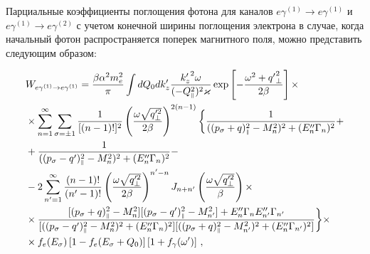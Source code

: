  Парциальные коэффициенты поглощения фотона для каналов $e \gamma^{(1)} \to 
 e\gamma^{(1)}$ и $e \gamma^{(1)} \to e\gamma^{(2)}$ с учетом конечной ширины 
 поглощения электрона в случае, когда начальный фотон 
 распространяется поперек магнитного поля, можно 
 представить следующим образом:


\begin{equation}\nonumber
	\begin{aligned}\label{Wres}
		&W_{e\gamma^{(1)}\to e\gamma^{(1)}}=\frac{\beta\alpha^2m_e^2}{\pi} \int 
		dQ_0dk'_z \frac{{k_z'}^2\omega } 
		{(-Q_{\mbox{\tiny $\|$}}^2)^2\varkappa}\exp\left[-\frac{\omega^2+{q'}_\perp^2}{2\beta}\right]\times
		\\
		&\times\sum_{n=1}^{\infty}\sum_{\sigma=\pm 1}\frac{1}{[(n-1)!]^2}\left(\frac{\omega \sqrt{q_\perp'^2}}{2\beta}\right)^{2(n-1)}\bigg\{
		\frac{1}{((p_\sigma+q)_{\mbox{\tiny $\|$}}^2-M_n^2)^2+(E''_n\Gamma_n)^2}  +\\
		&+\frac{1}{((p_\sigma-q')_{\mbox{\tiny $\|$}}^2-M_n^2)^2+(E''_n\Gamma_n)^2}-
		\\
		&-2
		\sum_{n'=1}^{\infty}\frac{(n-1)!}{(n'-1)!}\left(\frac{\omega \sqrt{q_\perp'^2}}{2\beta}\right)^{n'-n}J_{n+n'}\left(\frac{\omega \sqrt{q_\perp'^2}}{\beta}\right)\times\\
		&\times\frac{[(p_\sigma+q)^2_{\mbox{\tiny $\|$}}-M_n^2][(p_\sigma-q')^2_{\mbox{\tiny $\|$}}-M^2_{n'}]+E''_n\Gamma_nE''_{n'}\Gamma_{n'}}{[((p_\sigma-q')_{\mbox{\tiny $\|$}}^2-M_n^2)^2+(E''_n\Gamma_n)^2][((p_\sigma+q)_{\mbox{\tiny $\|$}}^2-M_{n'}^2)^2+(E''_n\Gamma_{n'})^2]}
		\bigg\}\times
		\\&\times 
		f_e{(E_\sigma)}\left[1-f_e{(E_\sigma+Q_0)}\right]\left[1+f_\gamma(\omega')\right]
		 \, ,
	\end{aligned}
\end{equation}

